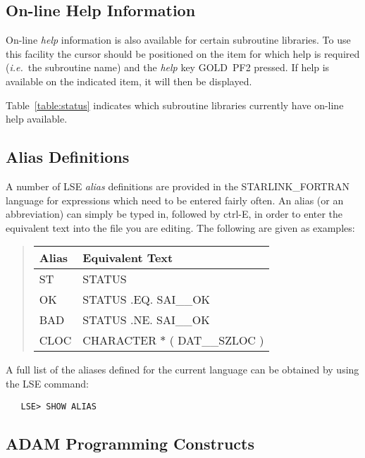 \subsection{On-line Help Information}

On-line {\em help} information is also available for certain subroutine
libraries.
To use this facility the cursor should be positioned on the item for which help
is required ({\em i.e.}\ the subroutine name) and the {\em help} key
\mbox{GOLD}~\mbox{PF2} pressed. 
If help is available on the indicated item, it will then be displayed.

Table~\ref{table:status} indicates which subroutine libraries currently have
on-line help available. 


\subsection{Alias Definitions}

A number of \mbox{LSE} {\em alias} definitions are provided in the
\mbox{STARLINK\_FORTRAN} language for expressions which need to be entered
fairly often. 
An alias (or an abbreviation) can simply be typed in, followed by
\mbox{ctrl-E}, in order to enter the equivalent text into the file you are
editing. 
The following are given as examples:

\begin{quote}
\begin{center}
\begin{tabular}{l|l}
{\bf Alias} & {\bf Equivalent Text}\\
\hline
ST & STATUS\\
OK & STATUS .EQ. SAI\_\_OK\\
BAD & STATUS .NE. SAI\_\_OK\\
CLOC & CHARACTER $*$ ( DAT\_\_SZLOC )
\end{tabular}
\end{center}
\end{quote}

A full list of the aliases defined for the current language can be obtained
by using the \mbox{LSE} command: 

\begin{verbatim}
   LSE> SHOW ALIAS
\end{verbatim}


\subsection{ADAM Programming Constructs}
\label{sect:adamconstructs}

